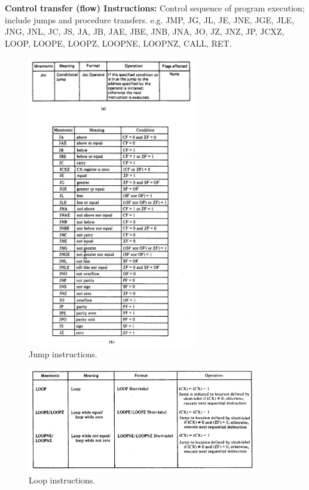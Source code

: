 \documentclass[12pt, a4paper]{scrartcl}
\begin{document}
	\textbf{Control transfer (flow) Instructions: }Control sequence of program execution; include jumps and procedure transfers. e.g. JMP, JG, JL, JE, JNE, JGE, JLE, JNG, JNL, JC, JS, JA, JB, JAE, JBE, JNB, JNA, JO, JZ, JNZ, JP, JCXZ, LOOP, LOOPE, LOOPZ, LOOPNE, LOOPNZ, CALL, RET.\\
	\begin{figure}[h]
		\centering
		\includegraphics[width=0.65\textwidth]{images/jump.png}
		\caption{Jump instructions.}
		\label{image-11}
	\end{figure}
	\begin{figure}[h]
		\centering
		\includegraphics[width=0.9\textwidth]{images/loop.png}
		\caption{Loop instructions.}
		\label{image-12}
	\end{figure}
\end{document}
